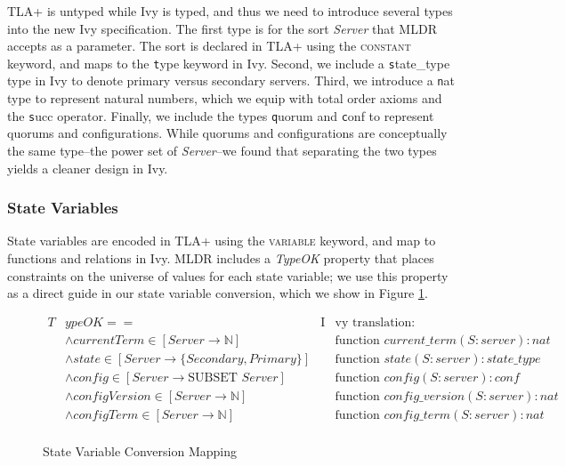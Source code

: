 \documentclass[runningheads]{llncs}
\newcommand{\tla}[1]{{\small\scshape #1}}
\newcommand{\ivy}[1]{{\small\texttt #1}}
\begin{document}
TLA+ is untyped while Ivy is typed, and thus we need to introduce several types into the new Ivy specification.  The first type is for the sort \textit{Server} that MLDR accepts as a parameter.  The sort is declared in TLA+ using the \tla{constant} keyword, and maps to the \ivy{type} keyword in Ivy.  Second, we include a \ivy{state\_type} type in Ivy to denote primary versus secondary servers.  Third, we introduce a \ivy{nat} type to represent natural numbers, which we equip with total order axioms and the \ivy{succ} operator.  Finally, we include the types \ivy{quorum} and \ivy{conf} to represent quorums and configurations.  While quorums and configurations are conceptually the same type--the power set of \textit{Server}--we found that separating the two types yields a cleaner design in Ivy.

\subsubsection{State Variables}

State variables are encoded in TLA+ using the \tla{variable} keyword, and map to functions and relations in Ivy.  MLDR includes a \textit{TypeOK} property that places constraints on the universe of values for each state variable; we use this property as a direct guide in our state variable conversion, which we show in Figure \ref{fig:statevar-map}.

\begin{figure}
  \begin{align*}
    T&ypeOK ==& \text{I}&\text{vy translation:}\\
      &\land currentTerm \in [Server \to \mathbb{N}]& &\text{function } current\_term(S:server) : nat\\
      &\land state \in [Server \to \{Secondary, Primary\}]& &\text{function } state(S:server) : state\_type\\
      &\land config \in [Server \to \text{SUBSET } Server]& &\text{function } config(S:server) : conf\\
      &\land configVersion \in [Server \to \mathbb{N}]& &\text{function } config\_version(S:server) : nat\\
      &\land configTerm \in [Server \to \mathbb{N}]& &\text{function } config\_term(S:server) : nat\\
  \end{align*}
  \caption{State Variable Conversion Mapping}
  \label{fig:statevar-map}
\end{figure}
\end{document}
